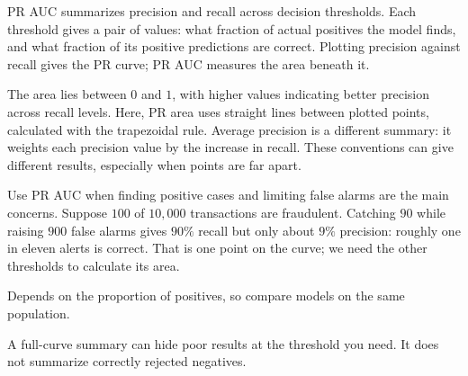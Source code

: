 \metricend
\clearpage
\thispagestyle{classificationstyle}
\label{sec:pr-auc}

PR AUC summarizes precision and recall across decision thresholds. Each threshold gives a pair of values: what fraction of actual positives the model finds, and what fraction of its positive predictions are correct. Plotting precision against recall gives the PR curve; PR AUC measures the area beneath it.

\begin{metricformula}
\end{metricformula}

The area lies between $0$ and $1$, with higher values indicating better precision across recall levels. Here, PR area uses straight lines between plotted points, calculated with the trapezoidal rule. Average precision is a different summary: it weights each precision value by the increase in recall. These conventions can give different results, especially when points are far apart.


Use PR AUC when finding positive cases and limiting false alarms are the main concerns. Suppose $100$ of $10{,}000$ transactions are fraudulent. Catching $90$ while raising $900$ false alarms gives $90\%$ recall but only about $9\%$ precision: roughly one in eleven alerts is correct. That is one point on the curve; we need the other thresholds to calculate its area.

{
\item Depends on the proportion of positives, so compare models on the same population.
\item A full-curve summary can hide poor results at the threshold you need. It does not summarize correctly rejected negatives.
}

